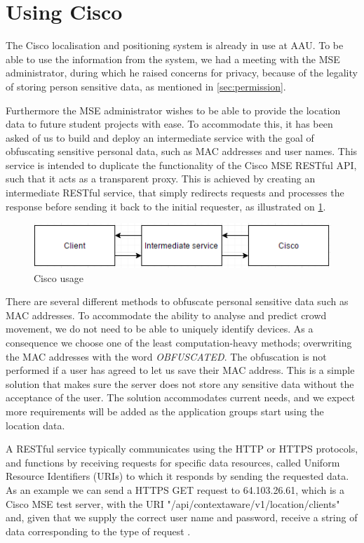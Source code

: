 \section{Using Cisco}\label{sec:cisco_usage}
The Cisco localisation and positioning system is already in use at AAU. To be able to use the information from the system, we had a meeting with the MSE administrator, during which he raised concerns for privacy, because of the legality of storing person sensitive data, as mentioned in \cref{sec:permission}. 

Furthermore the MSE administrator wishes to be able to provide the location data to future student projects with ease. To accommodate this, it has been asked of us to build and deploy an intermediate service with the goal of obfuscating sensitive personal data, such as MAC addresses and user names. This service is intended to duplicate the functionality of the Cisco MSE RESTful API, such that it acts as a transparent proxy. This is achieved by creating an intermediate RESTful service, that simply redirects requests and processes the response before sending it back to the initial requester, as illustrated on \cref{fig:cisco_usage}.

\begin{figure}[ht]
	\begin{center}
	\includegraphics[scale=0.9]{graphics/cisco_usage.png}
	\caption{Cisco usage}
	\label{fig:cisco_usage}
	\end{center} 
\end{figure}

There are several different methods to obfuscate personal sensitive data such as MAC addresses. To accommodate the ability to analyse and predict crowd movement, we do not need to be able to uniquely identify devices. As a consequence we choose one of the least computation-heavy methods; overwriting the MAC addresses with the word \emph{OBFUSCATED}. The obfuscation is not performed if a user has agreed to let us save their MAC address.
This is a simple solution that makes sure the server does not store any sensitive data without the acceptance of the user. The solution accommodates current needs, and we expect more requirements will be added as the application groups start using the location data.

A RESTful service typically communicates using the HTTP or HTTPS protocols, and functions by receiving requests for specific data resources, called Uniform Resource Identifiers (URIs) to which it responds by sending the requested data. As an example we can send a HTTPS GET request to 64.103.26.61, which is a Cisco MSE test server, with the URI "/api/contextaware/v1/location/clients" and, given that we supply the correct user name and password, receive a string of data corresponding to the type of request \cite{restful_oracle}.

